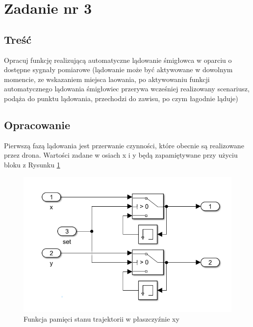 \documentclass[polish,11pt,a4paper]{article}
\begin{document}
\section*{Zadanie nr 3}
\subsection*{Treść}
Opracuj funkcję realizującą automatyczne lądowanie śmigłowca w oparciu o dostępne 
sygnały pomiarowe (lądowanie może być aktywowane w dowolnym momencie, ze wskazaniem miejsca laowania,
po aktywowaniu funkcji automatycznego lądowania śmigłowiec przerywa wcześniej realizowany scenariusz,
podąża do punktu lądowania, przechodzi do zawisu, po czym łagodnie ląduje)
\subsection*{Opracowanie}
Pierwszą fazą lądowania jest przerwanie czynności, które obecnie są realizowane przez drona. Wartości
zadane w osiach x i y będą zapamiętywane przy użyciu bloku z Rysunku \ref{fig:mem}

\begin{figure}[H]
	\centering
	\includegraphics[width=1\linewidth]{lądowanie/set.png}
	\caption{Funkcja pamięci stanu trajektorii w płaszczyźnie xy}
	\label{fig:mem}
	
\end{figure}
\end{document}
